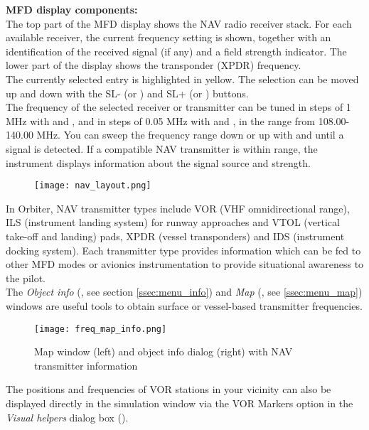 \documentclass[Orbiter User Manual.tex]{subfiles}
\begin{document}
\noindent
\textbf{MFD display components:}\\
The top part of the MFD display shows the NAV radio receiver stack. For each available receiver, the current frequency setting is shown, together with an identification of the received signal (if any) and a field strength indicator. The lower part of the display shows the transponder (XPDR) frequency.\\
The currently selected entry is highlighted in yellow. The selection can be moved up and down with the SL- (or \Shift\keystroke{,}) and SL+ (or \Shift{}) buttons.\\
The frequency of the selected receiver or transmitter can be tuned in steps of 1 MHz with \Shift\keystroke{-} and  \Shift\keystroke{=}, and in steps of 0.05 MHz with \Shift\keystroke{[} and \Shift\keystroke{]}, in the range from 108.00-140.00 MHz. You can sweep the frequency range down or up with \Shift{} and \Shift{} until a signal is detected. If a compatible NAV transmitter is within range, the instrument displays information about the signal source and strength.

\begin{figure}[H]
  \centering
  \texttt{[image: nav\_layout.png]}
\end{figure}

\noindent
In Orbiter, NAV transmitter types include VOR (VHF omnidirectional range), ILS (instrument landing system) for runway approaches and VTOL (vertical take-off and landing) pads, XPDR (vessel transponders) and IDS (instrument docking system). Each transmitter type provides information which can be fed to other MFD modes or avionics instrumentation to provide situational awareness to the pilot.\\
The \textit{Object info} (\Ctrl{}, see section \ref{ssec:menu_info}) and \textit{Map} (\Ctrl{}, see \ref{ssec:menu_map}) windows are useful tools to obtain surface or vessel-based transmitter frequencies.

\begin{figure}[H]
  \centering
  \texttt{[image: freq\_map\_info.png]}
  \caption{Map window (left) and object info dialog (right) with NAV transmitter information}
\end{figure}

\noindent
The positions and frequencies of VOR stations in your vicinity can also be displayed directly in the simulation window via the VOR Markers option in the \textit{Visual helpers} dialog box (\Ctrl{}).
\end{document}

